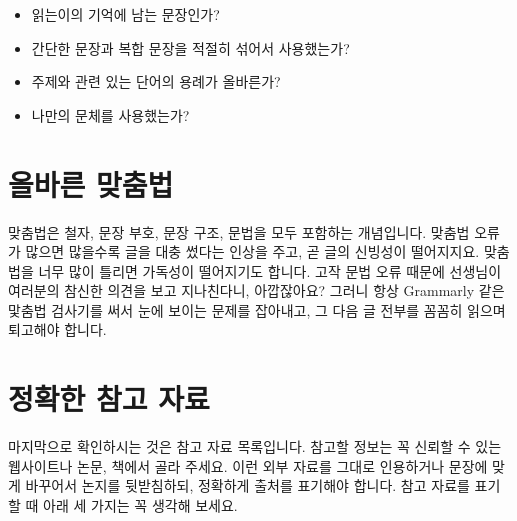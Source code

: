 \documentclass{translation}
\begin{document}
\begin{itemize}
\item 읽는이의 기억에 남는 문장인가?
\item 간단한 문장과 복합 문장을 적절히 섞어서 사용했는가?
\item 주제와 관련 있는 단어의 용례가 올바른가?
\item 나만의 문체를 사용했는가?
\end{itemize}

\section{올바른 맞춤법}

맞춤법은 철자, 문장 부호, 문장 구조, 문법을 모두 포함하는 개념입니다.
맞춤법 오류가 많으면 많을수록 글을 대충 썼다는 인상을 주고, 곧 글의 신빙성이 떨어지지요.
맞춤법을 너무 많이 틀리면 가독성이 떨어지기도 합니다.
고작 문법 오류 때문에 선생님이 여러분의 참신한 의견을 보고 지나친다니, 아깝잖아요?
그러니 항상 Grammarly 같은 맟춤법 검사기를 써서 눈에 보이는 문제를 잡아내고,
그 다음 글 전부를 꼼꼼히 읽으며 퇴고해야 합니다.

\section{정확한 참고 자료}

마지막으로 확인하시는 것은 참고 자료 목록입니다.
참고할 정보는 꼭 신뢰할 수 있는 웹사이트나 논문, 책에서 골라 주세요.
이런 외부 자료를 그대로 인용하거나 문장에 맞게 바꾸어서 논지를 뒷받침하되, 정확하게 출처를 표기해야 합니다.
참고 자료를 표기할 때 아래 세 가지는 꼭 생각해 보세요.
\end{document}
